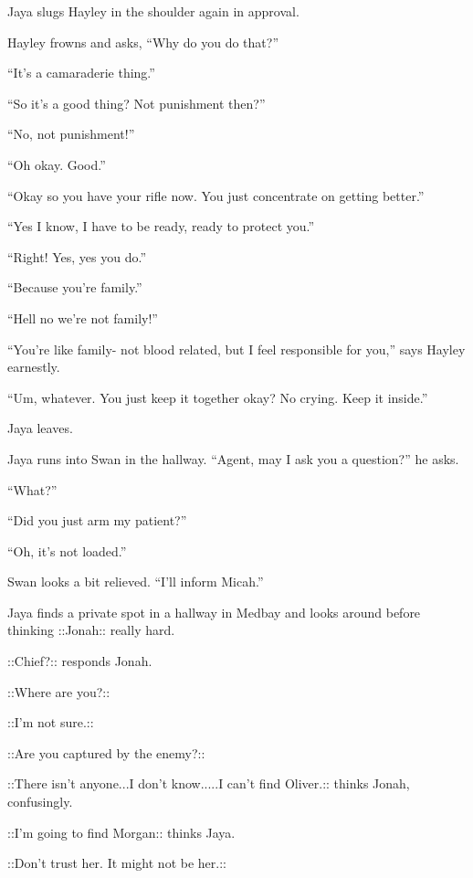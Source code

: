 Jaya slugs Hayley in the shoulder again in approval.

Hayley frowns and asks, ``Why do you do that?''

``It's a camaraderie thing.''

``So it's a good thing?  Not punishment then?''

``No, not punishment!''

``Oh okay.  Good.''

``Okay so you have your rifle now.  You just concentrate on getting better.''

``Yes I know, I have to be ready, ready to protect you.''

``Right!  Yes, yes you do.''

``Because you're family.''

``Hell no we're not family!''

``You're like family- not blood related, but I feel responsible for you,'' says Hayley earnestly.

``Um, whatever.  You just keep it together okay?  No crying.  Keep it inside.''

Jaya leaves.





Jaya runs into Swan in the hallway.  ``Agent, may I ask you a question?'' he asks.

``What?''

``Did you just arm my patient?'' 

``Oh, it's not loaded.''

Swan looks a bit relieved. ``I'll inform Micah.''



Jaya finds a private spot in a hallway in Medbay and looks around before thinking  {\color[RGB]{255,0,0}::Jonah::}  really hard.

 {\color[RGB]{0,0,255}::Chief?::}  responds Jonah.

 {\color[RGB]{255,0,0}::Where are you?::} 

 {\color[RGB]{0,0,255}::I'm not sure.::} 

 {\color[RGB]{255,0,0}::Are you captured by the enemy?::} 

 {\color[RGB]{0,0,255}::There isn't anyone...I don't know.....I can't find Oliver.::}  thinks Jonah, confusingly.

 {\color[RGB]{255,0,0}::I'm going to find Morgan:: } thinks Jaya.

 {\color[RGB]{0,0,255}::Don't trust her.  It might not be her.::} 



